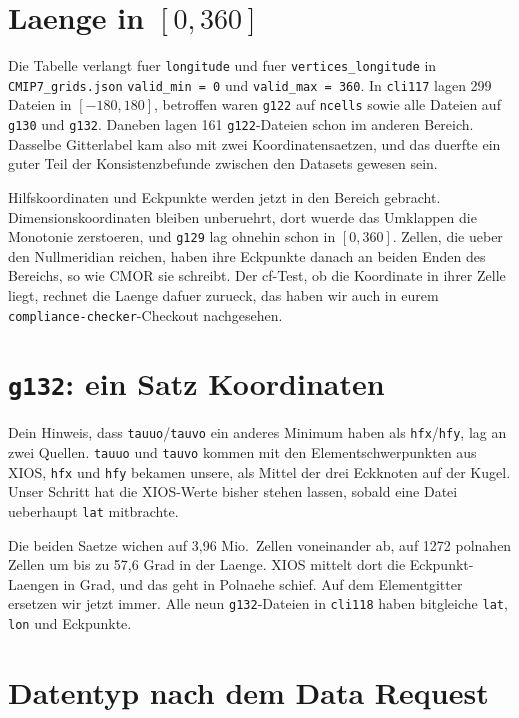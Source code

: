 \documentclass[11pt,a4paper]{article}
\newcommand{\code}[1]{\texttt{\small #1}}
\begin{document}
\section{Laenge in $[0, 360]$}

Die Tabelle verlangt fuer \code{longitude} und fuer \code{vertices\_longitude} in
\code{CMIP7\_grids.json} \code{valid\_min = 0} und \code{valid\_max = 360}. In
\code{cli117} lagen 299 Dateien in $[-180, 180]$, betroffen waren
\code{g122} auf \code{ncells} sowie alle Dateien auf \code{g130} und \code{g132}.
Daneben lagen 161 \code{g122}-Dateien schon im anderen Bereich. Dasselbe
Gitterlabel kam also mit zwei Koordinatensaetzen, und das duerfte ein guter Teil
der Konsistenzbefunde zwischen den Datasets gewesen sein.

Hilfskoordinaten und Eckpunkte werden jetzt in den Bereich gebracht.
Dimensionskoordinaten bleiben unberuehrt, dort wuerde das Umklappen die
Monotonie zerstoeren, und \code{g129} lag ohnehin schon in $[0, 360]$. Zellen,
die ueber den Nullmeridian reichen, haben ihre Eckpunkte danach an beiden Enden
des Bereichs, so wie CMOR sie schreibt. Der cf-Test, ob die Koordinate in ihrer
Zelle liegt, rechnet die Laenge dafuer zurueck, das haben wir auch in eurem
\code{compliance-checker}-Checkout nachgesehen.

\section{\code{g132}: ein Satz Koordinaten}

Dein Hinweis, dass \code{tauuo}/\code{tauvo} ein anderes Minimum haben als
\code{hfx}/\code{hfy}, lag an zwei Quellen. \code{tauuo} und \code{tauvo} kommen mit
den Elementschwerpunkten aus XIOS, \code{hfx} und \code{hfy} bekamen unsere, als
Mittel der drei Eckknoten auf der Kugel. Unser Schritt hat die XIOS-Werte bisher
stehen lassen, sobald eine Datei ueberhaupt \code{lat} mitbrachte.

Die beiden Saetze wichen auf 3{,}96 Mio.\ Zellen voneinander ab, auf 1272
polnahen Zellen um bis zu 57{,}6 Grad in der Laenge. XIOS mittelt dort die
Eckpunkt-Laengen in Grad, und das geht in Polnaehe schief. Auf dem Elementgitter
ersetzen wir jetzt immer. Alle neun \code{g132}-Dateien in \code{cli118} haben
bitgleiche \code{lat}, \code{lon} und Eckpunkte.

\section{Datentyp nach dem Data Request}
\end{document}
